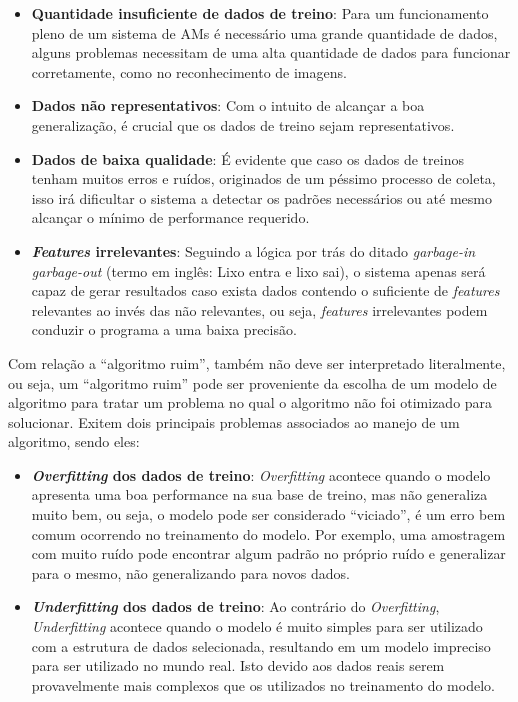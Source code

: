 \begin{itemize}
    \item \textbf{Quantidade insuficiente de dados de treino}: Para um funcionamento pleno de um sistema de AMs é necessário uma grande quantidade de dados, alguns problemas necessitam de uma alta quantidade de dados para funcionar corretamente, como no reconhecimento de imagens.
    \item \textbf{Dados não representativos}: Com o intuito de alcançar a boa generalização, é crucial que os dados de treino sejam representativos.
    \item \textbf{Dados de baixa qualidade}: É evidente que caso os dados de treinos tenham muitos erros e ruídos, originados de um péssimo processo de coleta, isso irá dificultar o sistema a detectar os padrões necessários ou até mesmo alcançar o mínimo de performance requerido.
    \item \textbf{\textit{Features}  irrelevantes}: Seguindo a lógica por trás do ditado \textit{garbage-in garbage-out} (termo em inglês: Lixo entra e lixo sai), o sistema apenas será capaz de gerar resultados caso exista dados contendo o suficiente de \textit{features} relevantes ao invés das não relevantes, ou seja, \textit{features} irrelevantes podem conduzir o programa a uma baixa precisão.
\end{itemize}

Com relação a “algoritmo ruim”, também não deve ser interpretado literalmente, ou seja, um “algoritmo ruim” pode ser proveniente da escolha de um modelo de algoritmo para tratar um problema no qual o algoritmo não foi otimizado para solucionar. Exitem dois principais problemas associados ao manejo de um algoritmo, sendo eles:

\begin{itemize}
    \item \textbf{\textit{Overfitting} dos dados de treino}: \textit{Overfitting} acontece quando o modelo apresenta uma boa performance na sua base de treino, mas não generaliza muito bem, ou seja, o modelo pode ser considerado “viciado”, é um erro bem comum ocorrendo no treinamento do modelo. Por exemplo, uma amostragem com muito ruído pode encontrar algum padrão no próprio ruído e generalizar para o mesmo, não generalizando para novos dados.
    \item \textbf{\textit{Underfitting} dos dados de treino}: Ao contrário do \textit{Overfitting}, \textit{Underfitting} acontece quando o modelo é muito simples para ser utilizado com a estrutura de dados selecionada, resultando em um modelo impreciso para ser utilizado no mundo real. Isto devido aos dados reais serem provavelmente mais complexos que os utilizados no treinamento do modelo.
\end{itemize}

